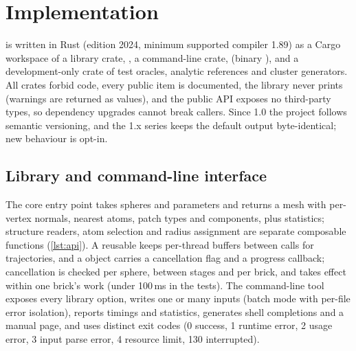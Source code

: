 
\section{Implementation}
\label{sec:implementation}

\sesmesh{} is written in Rust (edition 2024, minimum supported compiler
1.89) as a Cargo workspace of a library crate, , a
command-line crate,  (binary ), and a
development-only crate of test oracles, analytic references and cluster
generators. All crates forbid  code, every public item is
documented, the library never prints (warnings are returned as values), and
the public API exposes no third-party types, so dependency upgrades cannot
break callers. Since 1.0 the project follows semantic versioning, and the
1.x series keeps the default output byte-identical; new behaviour is
opt-in.

\subsection{Library and command-line interface}

The core entry point takes spheres and parameters and returns a mesh with
per-vertex normals, nearest atoms, patch types and components, plus
statistics; structure readers, atom selection and radius assignment are
separate composable functions (\cref{lst:api}). A reusable
 keeps per-thread buffers between calls for
trajectories, and a  object carries a cancellation flag and a
progress callback; cancellation is checked per sphere, between stages and
per brick, and takes effect within one brick's work (under 100\,ms in the
tests). The command-line tool exposes every library option, writes one or
many inputs (batch mode with per-file error isolation), reports timings and
statistics, generates shell completions and a manual page, and uses
distinct exit codes (0 success, 1 runtime error, 2 usage error, 3 input
parse error, 4 resource limit, 130 interrupted).

